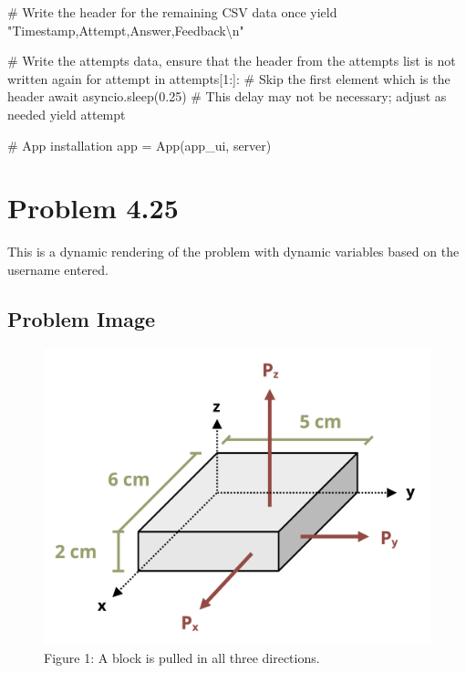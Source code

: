 \documentclass[
  letterpaper,
  DIV=11,
  numbers=noendperiod]{scrreprt}
\newenvironment{Shaded}{\begin{snugshade}}{\end{snugshade}}
\newcommand{\NormalTok}[1]{\textcolor[rgb]{0.00,0.23,0.31}{#1}}
\begin{document}
\begin{Shaded}
\begin{Highlighting}[]
\NormalTok{        \# Write the header for the remaining CSV data once}
\NormalTok{        yield "Timestamp,Attempt,Answer,Feedback\textbackslash{}n"}
        
\NormalTok{        \# Write the attempts data, ensure that the header from the attempts list is not written again}
\NormalTok{        for attempt in attempts[1:]:  \# Skip the first element which is the header}
\NormalTok{            await asyncio.sleep(0.25)  \# This delay may not be necessary; adjust as needed}
\NormalTok{            yield attempt}


\NormalTok{\# App installation}
\NormalTok{app = App(app\_ui, server)}
\end{Highlighting}
\end{Shaded}

\chapter*{Problem 4.25}\label{problem-4.25}


This is a dynamic rendering of the problem with dynamic variables based
on the username entered.

\section*{Problem Image}\label{problem-image-26}


\begin{figure}[H]

{\centering \includegraphics{images/208.png}

}

\caption{Figure 1: A block is pulled in all three directions.}

\end{figure}%
\end{document}
